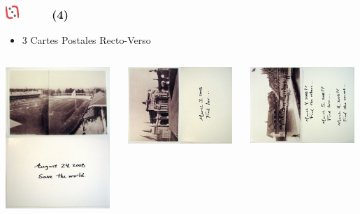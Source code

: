 \documentclass[slidetop,11pt]{beamer}
\def\moreInFrameTitleLeftt{\includegraphics[height=0.5cm]{img/ligueludique-0.png}~~~~~}
\begin{document}
\begin{frame}
	\frametitle{\moreInFrameTitleLeftt \sectionPartIIaIV  (4) }
	\begin{itemize}
		\item 3 Cartes Postales Recto-Verso
	\end{itemize}
	\begin{columns}[T]
		\begin{column}[T]{4.05cm}
			\includegraphics[width=3.95cm]{img/argTheLostRing/2299369980_6cd3e50860_o.jpg}
		\end{column}
		\begin{column}[T]{4.05cm}
			\includegraphics[width=3.95cm]{img/argTheLostRing/2299370206_89505225a9_o.jpg}
		\end{column}
		\begin{column}[T]{4.05cm}
			\includegraphics[width=3.95cm]{img/argTheLostRing/2298573497_9faf88fc1d_o.jpg}
		\end{column}
	\end{columns}
\end{frame} 

\end{document}
